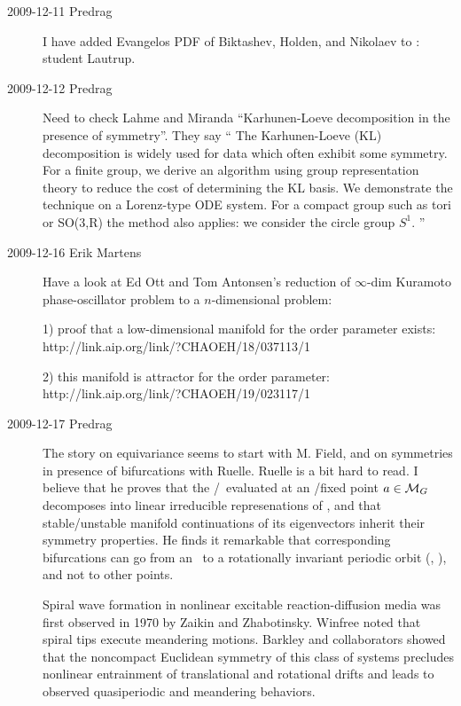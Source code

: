 \begin{description}
\item[2009-12-11 Predrag] I have added Evangelos PDF of Biktashev,
Holden, and Nikolaev to : student Lautrup.

\item[2009-12-12 Predrag] Need to check Lahme and Miranda
``Karhunen-Loeve decomposition in the presence of symmetry''. They say
``
The Karhunen-Loeve (KL) decomposition is
  widely used for data which often exhibit some symmetry.
  For a finite group, we derive an
  algorithm using group representation theory to reduce the
  cost of determining the KL basis. We demonstrate the
  technique on a Lorenz-type ODE system. For a compact group
  such as tori or SO(3,R) the method also applies: we
  consider the circle group $S^1$.
''
                                    \toCB


\item[2009-12-16 Erik Martens] %
Have a look at
Ed Ott and Tom Antonsen's reduction of $\infty$-dim Kuramoto phase-oscillator
problem to a $n$-dimensional problem:

1) proof that a low-dimensional manifold for the order parameter exists:
\\
{http://link.aip.org/link/?CHAOEH/18/037113/1}

2) this manifold is attractor for the order parameter:
\\
{http://link.aip.org/link/?CHAOEH/19/023117/1}

\item[2009-12-17 Predrag]
The story on equivariance seems to start with M. Field, and
on symmetries in presence of bifurcations with Ruelle. Ruelle
is a bit hard to read. I believe that he proves that the
\stabmat/\jacobianM\ evaluated at an \eqv/fixed point $a \in {\cal M}_G$
decomposes into linear irreducible represenations of \Group, and that
stable/unstable manifold continuations of its eigenvectors inherit their
symmetry properties. He finds it remarkable that corresponding
bifurcations can go from an \eqv\ to a rotationally invariant periodic
orbit (\ie, \reqv), and not to other points.
	                                                           \toCB

Spiral wave formation in nonlinear excitable reaction-diffusion media was
first observed in 1970 by Zaikin and Zhabotinsky.
Winfree noted that spiral tips execute
meandering motions.
Barkley and collaborators showed that the
noncompact Euclidean symmetry of this class of systems precludes
nonlinear entrainment of translational and rotational drifts and leads to
observed quasiperiodic and meandering behaviors.


\end{description}
